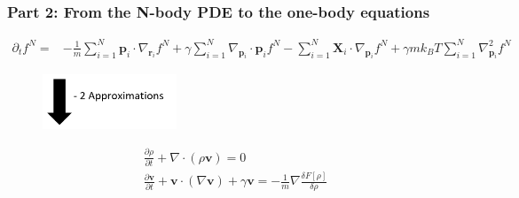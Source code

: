 \documentclass[aspectratio=169,xcolor=dvipsnames]{beamer}
\begin{document}
\begin{frame}
	\frametitle{Part 2: From the N-body PDE to the one-body equations}
    \begin{align*}
	\partial_t f^N = &- \frac{1}{m} \sum_{i=1}^N \mathbf{p}_i \cdot \nabla_{\mathbf{r}_i} f^N + \gamma \sum_{i = 1}^N \nabla_{\mathbf{p}_i}
	\cdot \mathbf{p}_i f^N - \sum_{i=1}^N \mathbf{X}_i \cdot \nabla_{\mathbf{p}_i}f^N + \gamma m k_BT \sum_{i=1}^N \nabla^2_{\mathbf{p}_i}f^N	
	\end{align*}
		\vspace{-0.2cm}
	\begin{figure}
		\includegraphics[width=4cm]{Arrow3.png}
	\end{figure}
	\vspace{-0.3cm}
	\begin{align*}
	&\frac{\partial \rho}{\partial t} + \nabla \cdot \left(\rho \mathbf{v}\right) = 0 \\
	&\frac{\partial \mathbf{v}}{\partial t} + \mathbf{v} \cdot \left(\nabla \mathbf{v}\right) + \gamma \mathbf{v} = - \frac{1}{m} \nabla \frac{\delta {F}[\rho]}{\delta \rho}
	\end{align*}
\end{frame}
\end{document}
